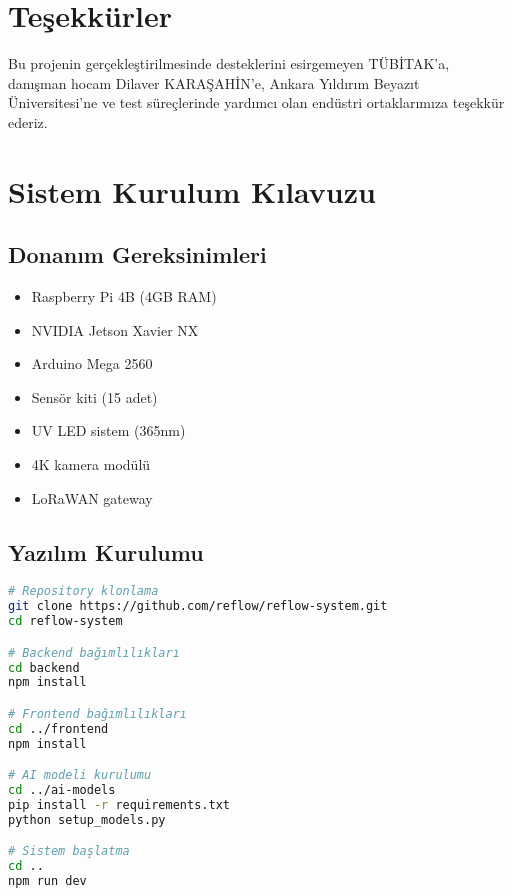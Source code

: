 \documentclass[12pt,a4paper]{article}
\begin{document}
\section*{Teşekkürler}

Bu projenin gerçekleştirilmesinde desteklerini esirgemeyen TÜBİTAK'a, danışman hocam Dilaver KARAŞAHİN'e, Ankara Yıldırım Beyazıt Üniversitesi'ne ve test süreçlerinde yardımcı olan endüstri ortaklarımıza teşekkür ederiz.




\newpage
\appendix

\section{Sistem Kurulum Kılavuzu}

\subsection{Donanım Gereksinimleri}

\begin{itemize}
    \item Raspberry Pi 4B (4GB RAM)
    \item NVIDIA Jetson Xavier NX
    \item Arduino Mega 2560
    \item Sensör kiti (15 adet)
    \item UV LED sistem (365nm)
    \item 4K kamera modülü
    \item LoRaWAN gateway
\end{itemize}

\subsection{Yazılım Kurulumu}

\begin{lstlisting}[language=bash, caption=Backend Kurulum Komutu]
# Repository klonlama
git clone https://github.com/reflow/reflow-system.git
cd reflow-system

# Backend bağımlılıkları
cd backend
npm install

# Frontend bağımlılıkları  
cd ../frontend
npm install

# AI modeli kurulumu
cd ../ai-models
pip install -r requirements.txt
python setup_models.py

# Sistem başlatma
cd ..
npm run dev
\end{lstlisting}
\end{document}
